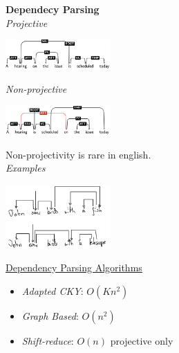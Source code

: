 \documentclass[8pt]{extarticle} %
\begin{document}
\begin{multicols*}{3}
\textbf{Dependecy Parsing}\\
\textit{Projective}
\begin{center}
    \includegraphics[width=0.3\textwidth]{media/dependency-projective.png}
\end{center}
\textit{Non-projective}
\begin{center}
    \includegraphics[width=0.3\textwidth]{media/dependency-non-projecitve.png}
\end{center}
Non-projectivity is rare in english.\\
\textit{Examples}
\begin{center}
    \includegraphics[width=0.3\textwidth]{media/dependency-parse.png}
\end{center}
\underline{Dependency Parsing Algorithms}
\begin{itemize}[label=\textbullet, labelsep=0.3em, leftmargin=0.5em, itemsep=0em]
    \item \textit{Adapted CKY}: $O(Kn^2)$
    \item \textit{Graph Based}: $O(n^2)$
    \item \textit{Shift-reduce}: $O(n)$ projective only
\end{itemize}


\end{multicols*}
\end{document}
